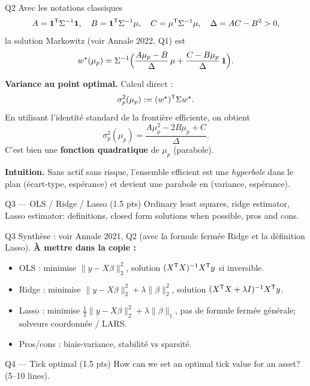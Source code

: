 \begin{solutionbox}{Q2}
Avec les notations classiques
\[
A=\mathbf{1}^{\mathsf{T}}\Sigma^{-1}\mathbf{1},\quad B=\mathbf{1}^{\mathsf{T}}\Sigma^{-1}\mu,\quad C=\mu^{\mathsf{T}}\Sigma^{-1}\mu,\quad \Delta=AC-B^2>0,
\]
la solution Markowitz (voir Annale 2022, Q1) est
\[
w^\star(\mu_p)=\Sigma^{-1}\Big(\frac{A\mu_p-B}{\Delta}\,\mu + \frac{C-B\mu_p}{\Delta}\,\mathbf{1}\Big).
\]

\medskip
\textbf{Variance au point optimal.} Calcul direct :
\[
\sigma_p^2(\mu_p):=(w^\star)^{\mathsf{T}}\Sigma w^\star.
\]
En utilisant l'identité standard de la frontière efficiente, on obtient
\[
\boxed{
\sigma_p^2(\mu_p)
=
\frac{A\mu_p^2 -2B\mu_p + C}{\Delta}.
}
\]
C'est bien une \textbf{fonction quadratique} de $\mu_p$ (parabole).

\medskip
\textbf{Intuition.} Sans actif sans risque, l'ensemble efficient est une \emph{hyperbole} dans le plan (écart-type, espérance) et devient une parabole en (variance, espérance).
\end{solutionbox}

\begin{questionbox}{Q3 --- OLS / Ridge / Lasso (1.5 pts)}
Ordinary least squares, ridge estimator, Lasso estimator: definitions, closed form solutions when possible, pros and cons.
\end{questionbox}

\begin{solutionbox}{Q3}
Synthèse : voir Annale 2021, Q2 (avec la formule fermée Ridge et la définition Lasso). \textbf{À mettre dans la copie :}
\begin{itemize}[leftmargin=*]
  \item OLS : minimise $\|y-X\beta\|_2^2$, solution $(X^{\mathsf{T}} X)^{-1}X^{\mathsf{T}} y$ si inversible.
  \item Ridge : minimise $\|y-X\beta\|_2^2+\lambda\|\beta\|_2^2$, solution $(X^{\mathsf{T}} X+\lambda I)^{-1}X^{\mathsf{T}} y$.
  \item Lasso : minimise $\frac12\|y-X\beta\|_2^2+\lambda\|\beta\|_1$, pas de formule fermée générale; solveurs coordonnée / LARS.
  \item Pros/cons : biais-variance, stabilité vs sparsité.
\end{itemize}
\end{solutionbox}

\begin{questionbox}{Q4 --- Tick optimal (1.5 pts)}
How can we set an optimal tick value for an asset? (5--10 lines).
\end{questionbox}


